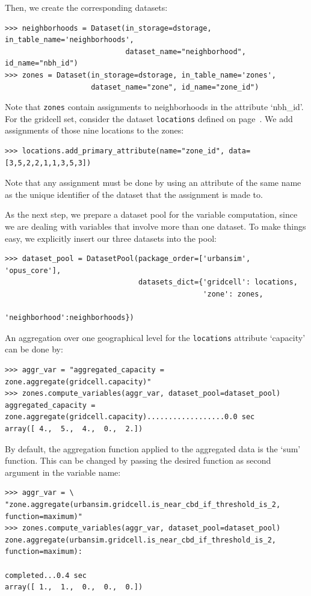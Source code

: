 Then, we create the corresponding datasets: 
\begin{verbatim}
>>> neighborhoods = Dataset(in_storage=dstorage, in_table_name='neighborhoods',
                            dataset_name="neighborhood", id_name="nbh_id")
>>> zones = Dataset(in_storage=dstorage, in_table_name='zones',
                    dataset_name="zone", id_name="zone_id")
\end{verbatim}
Note that \verb|zones| contain assignments to neighborhoods in the
attribute `nbh_id'.  For the gridcell set, consider the dataset 
\verb|locations| defined on page~\pageref{page:tutorial-gc-locations}. We
add assignments of those nine locations to the zones:

\begin{verbatim}
>>> locations.add_primary_attribute(name="zone_id", data=[3,5,2,2,1,1,3,5,3])
\end{verbatim}
Note that any assignment must be done by using an attribute of the same name
as the unique identifier of the dataset that the assignment is made to.

As the next step, we prepare a dataset pool  for the variable computation, since we are dealing with variables
that involve more than one dataset. To make things easy, we explicitly insert
our three datasets into the pool:
\begin{verbatim}
>>> dataset_pool = DatasetPool(package_order=['urbansim', 'opus_core'],
                               datasets_dict={'gridcell': locations,
                                              'zone': zones, 
                                              'neighborhood':neighborhoods})
\end{verbatim}
An aggregation over one geographical level for the \verb|locations|
attribute `capacity' can be done by:

\begin{verbatim}
>>> aggr_var = "aggregated_capacity = zone.aggregate(gridcell.capacity)"
>>> zones.compute_variables(aggr_var, dataset_pool=dataset_pool)
aggregated_capacity = zone.aggregate(gridcell.capacity)..................0.0 sec
array([ 4.,  5.,  4.,  0.,  2.])
\end{verbatim}
By default, the aggregation function applied to the aggregated data is the
`sum' function. This can be changed by passing the desired function as second
argument in the variable name:
\begin{verbatim}
>>> aggr_var = \
"zone.aggregate(urbansim.gridcell.is_near_cbd_if_threshold_is_2, function=maximum)"
>>> zones.compute_variables(aggr_var, dataset_pool=dataset_pool)
zone.aggregate(urbansim.gridcell.is_near_cbd_if_threshold_is_2, function=maximum):
                                                            completed...0.4 sec
array([ 1.,  1.,  0.,  0.,  0.])
\end{verbatim}

